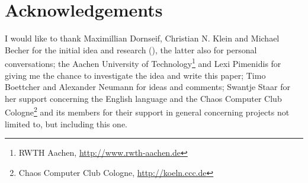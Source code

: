 %
%

\section{Acknowledgements}

I would like to thank Maximillian Dornseif, Christian N. Klein and Michael
Becher for the initial idea and research (\cite{cansecwest_firewire:2005}), the
latter also for personal conversations; the Aachen University of
Technology\footnote{RWTH Aachen,
\href{http://www.rwth-aachen.de}{http://www.rwth-aachen.de}} and Lexi Pimenidis
for giving me the chance to investigate the idea and write this paper; Timo
Boettcher and Alexander Neumann for ideas and comments; Swantje Staar for her
support concerning the English language and the Chaos Computer Club
Cologne\footnote{Chaos Computer Club Cologne,
\href{http://koeln.ccc.de}{http://koeln.ccc.de}} and its members for their
support in general concerning projects not limited to, but including this one.

